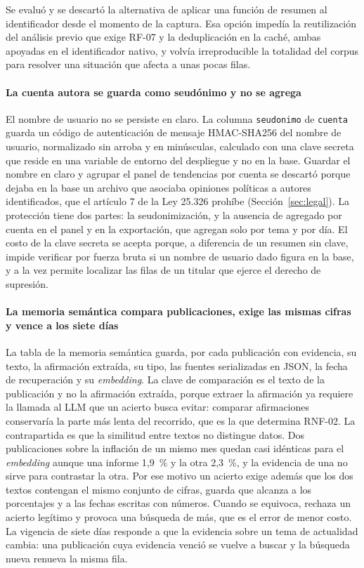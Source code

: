 Se evaluó y se descartó la alternativa de aplicar una función de resumen al identificador desde el momento de la captura. Esa opción impedía la reutilización del análisis previo que exige RF-07 y la deduplicación en la caché, ambas apoyadas en el identificador nativo, y volvía irreproducible la totalidad del corpus para resolver una situación que afecta a unas pocas filas.

\paragraph{La cuenta autora se guarda como seudónimo y no se agrega}

El nombre de usuario no se persiste en claro. La columna \texttt{seudonimo} de \texttt{cuenta} guarda un código de autenticación de mensaje HMAC-SHA256 del nombre de usuario, normalizado sin arroba y en minúsculas, calculado con una clave secreta que reside en una variable de entorno del despliegue y no en la base. Guardar el nombre en claro y agrupar el panel de tendencias por cuenta se descartó porque dejaba en la base un archivo que asociaba opiniones políticas a autores identificados, que el artículo 7 de la Ley 25.326 prohíbe (Sección~\ref{sec:legal}). La protección tiene dos partes: la seudonimización, y la ausencia de agregado por cuenta en el panel y en la exportación, que agregan solo por tema y por día. El costo de la clave secreta se acepta porque, a diferencia de un resumen sin clave, impide verificar por fuerza bruta si un nombre de usuario dado figura en la base, y a la vez permite localizar las filas de un titular que ejerce el derecho de supresión.

\paragraph{La memoria semántica compara publicaciones, exige las mismas cifras y vence a los siete días}

La tabla de la memoria semántica guarda, por cada publicación con evidencia, su texto, la afirmación extraída, su tipo, las fuentes serializadas en JSON, la fecha de recuperación y su \textit{embedding}. La clave de comparación es el texto de la publicación y no la afirmación extraída, porque extraer la afirmación ya requiere la llamada al LLM que un acierto busca evitar: comparar afirmaciones conservaría la parte más lenta del recorrido, que es la que determina RNF-02. La contrapartida es que la similitud entre textos no distingue datos. Dos publicaciones sobre la inflación de un mismo mes quedan casi idénticas para el \textit{embedding} aunque una informe 1,9~\% y la otra 2,3~\%, y la evidencia de una no sirve para contrastar la otra. Por ese motivo un acierto exige además que los dos textos contengan el mismo conjunto de cifras, guarda que alcanza a los porcentajes y a las fechas escritas con números. Cuando se equivoca, rechaza un acierto legítimo y provoca una búsqueda de más, que es el error de menor costo. La vigencia de siete días responde a que la evidencia sobre un tema de actualidad cambia: una publicación cuya evidencia venció se vuelve a buscar y la búsqueda nueva renueva la misma fila.

